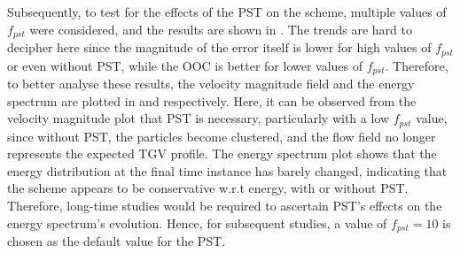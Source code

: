 Subsequently, to test for the effects of the PST on the scheme, multiple values of $f_{pst}$ were considered, and the results are shown in .
The trends are hard to decipher here since the magnitude of the error itself is lower for high values of $f_{pst}$ or even without PST, while the OOC is better for lower values of $f_{pst}$.
Therefore, to better analyse these results, the velocity magnitude field and the energy spectrum are plotted in  and  respectively.
Here, it can be observed from the velocity magnitude plot that PST is necessary, particularly with a low $f_{pst}$ value, since without PST, the particles become clustered, and the flow field no longer represents the expected TGV profile.
The energy spectrum plot shows that the energy distribution at the final time instance has barely changed, indicating that the scheme appears to be conservative w.r.t energy, with or without PST. Therefore, long-time studies would be required to ascertain PST's effects on the energy spectrum's evolution.
Hence, for subsequent studies, a value of $f_{pst} = 10$ is chosen as the default value for the PST.

